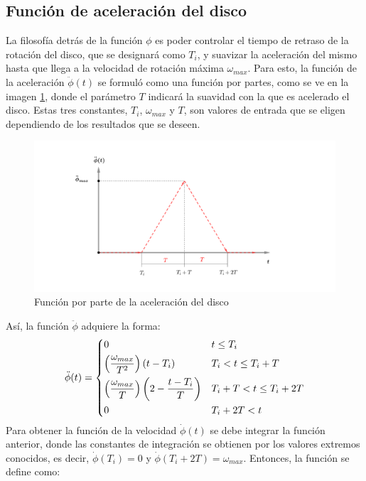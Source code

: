 \subsection{Función de aceleración del disco}
\label{sec:function_angle}
La filosofía detrás de la función $\phi$ es poder controlar el tiempo de retraso de la rotación del disco, que se designará como $T_i$, y suavizar la aceleración del mismo hasta que llega a la velocidad de rotación máxima $\omega_{max}$. Para esto, la función de la aceleración $\ddot{\phi}(t)$ se formuló como una función por partes, como se ve en la imagen \ref{fig:anglepp}, donde el parámetro $T$ indicará la suavidad con la que es acelerado el disco. Estas tres constantes, $T_i$, $\omega_{max}$ y $T$, son valores de entrada que se eligen dependiendo de los resultados que se deseen.
\begin{figure}[h]
\centering
\includegraphics[scale=0.45,trim={6.5cm 2cm 10cm 2cm},clip]{Imagenes/anglepp_function.pdf}
\caption{Función por parte de la aceleración del disco}
\label{fig:anglepp}
\end{figure}
Así, la función $\ddot{\phi}$ adquiere la forma:
\[ \ddot{\phi}(t) =
\begin{dcases}
	0																		&	t \leq T_i \\
	\left(\frac{\omega_{max}}{T^2}\right)\left(t - T_i\right)				&	T_i < t \leq T_i + T\\
	\left(\frac{\omega_{max}}{T}\right)\left(2 - \frac{t - T_i}{T}\right)	&	T_i + T < t \leq T_i + 2T\\
	0																		&	T_i + 2T < t\\
\end{dcases} 
\]
Para obtener la función de la velocidad $\dot{\phi}(t)$ se debe integrar la función anterior, donde las constantes de integración se obtienen por los valores extremos conocidos, es decir, $\dot{\phi}(T_i) = 0$ y $\dot{\phi}(T_i + 2T) = \omega_{max}$. Entonces, la función se define como:
